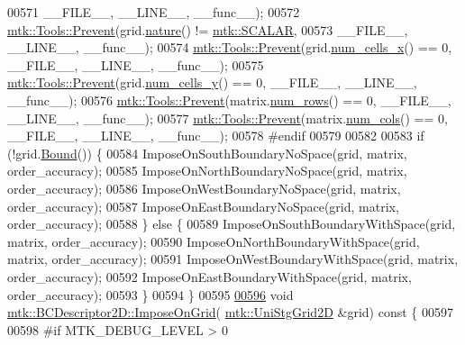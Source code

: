 \begin{DoxyCode}
00571                       \_\_FILE\_\_, \_\_LINE\_\_, \_\_func\_\_);
00572   \hyperlink{classmtk_1_1Tools_a332324c6f25e66be9dff48c5987a3b9f}{mtk::Tools::Prevent}(grid.\hyperlink{classmtk_1_1UniStgGrid2D_a99a3a9cdb05b7306be99bde935509e30}{nature}() != \hyperlink{namespacemtk_ga4c54f2a329cfb4e56213b02a259d19e2af481d45bd70d41381c7d72e200889205}{mtk::SCALAR},
00573                       \_\_FILE\_\_, \_\_LINE\_\_, \_\_func\_\_);
00574   \hyperlink{classmtk_1_1Tools_a332324c6f25e66be9dff48c5987a3b9f}{mtk::Tools::Prevent}(grid.\hyperlink{classmtk_1_1UniStgGrid2D_a2d182866a398aba8e4829590e85bf939}{num\_cells\_x}() == 0, \_\_FILE\_\_, \_\_LINE\_\_, \_\_func\_\_);
00575   \hyperlink{classmtk_1_1Tools_a332324c6f25e66be9dff48c5987a3b9f}{mtk::Tools::Prevent}(grid.\hyperlink{classmtk_1_1UniStgGrid2D_aed05a801cc9a76dba0ff203cea58a61a}{num\_cells\_y}() == 0, \_\_FILE\_\_, \_\_LINE\_\_, \_\_func\_\_);
00576   \hyperlink{classmtk_1_1Tools_a332324c6f25e66be9dff48c5987a3b9f}{mtk::Tools::Prevent}(matrix.\hyperlink{classmtk_1_1DenseMatrix_a53f3afb3b6a8d21854458aaa9663cc74}{num\_rows}() == 0, \_\_FILE\_\_, \_\_LINE\_\_, \_\_func\_\_);
00577   \hyperlink{classmtk_1_1Tools_a332324c6f25e66be9dff48c5987a3b9f}{mtk::Tools::Prevent}(matrix.\hyperlink{classmtk_1_1DenseMatrix_a41747502d468c6728a4be31501b16e0e}{num\_cols}() == 0, \_\_FILE\_\_, \_\_LINE\_\_, \_\_func\_\_);
00578 \textcolor{preprocessor}{  #endif}
00579 
00582 
00583   \textcolor{keywordflow}{if} (!grid.\hyperlink{classmtk_1_1UniStgGrid2D_aa651194ccd0321a7c61a8f56fa5e8455}{Bound}()) \{
00584     ImposeOnSouthBoundaryNoSpace(grid, matrix, order\_accuracy);
00585     ImposeOnNorthBoundaryNoSpace(grid, matrix, order\_accuracy);
00586     ImposeOnWestBoundaryNoSpace(grid, matrix, order\_accuracy);
00587     ImposeOnEastBoundaryNoSpace(grid, matrix, order\_accuracy);
00588   \} \textcolor{keywordflow}{else} \{
00589     ImposeOnSouthBoundaryWithSpace(grid, matrix, order\_accuracy);
00590     ImposeOnNorthBoundaryWithSpace(grid, matrix, order\_accuracy);
00591     ImposeOnWestBoundaryWithSpace(grid, matrix, order\_accuracy);
00592     ImposeOnEastBoundaryWithSpace(grid, matrix, order\_accuracy);
00593   \}
00594 \}
00595 
\hypertarget{mtk__bc__descriptor__2d_8cc_source_l00596}{}\hyperlink{classmtk_1_1BCDescriptor2D_a5f0ff1fda1b5266dcd77ba2301c8ba2c}{00596} \textcolor{keywordtype}{void} \hyperlink{classmtk_1_1BCDescriptor2D_a5f0ff1fda1b5266dcd77ba2301c8ba2c}{mtk::BCDescriptor2D::ImposeOnGrid}(
      \hyperlink{classmtk_1_1UniStgGrid2D}{mtk::UniStgGrid2D} &grid)\textcolor{keyword}{ const }\{
00597 
00598 \textcolor{preprocessor}{  #if MTK\_DEBUG\_LEVEL > 0}

\end{DoxyCode}
